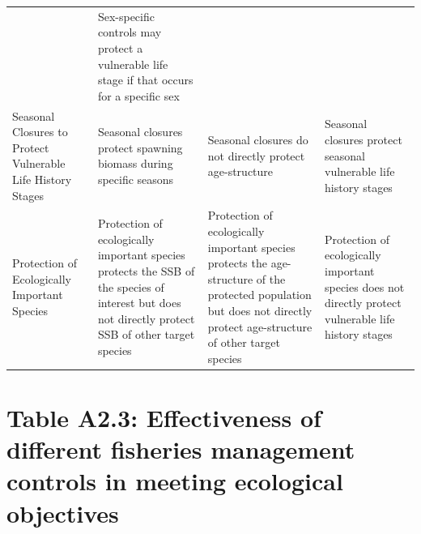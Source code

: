 \documentclass[]{book}
\begin{document}
\begin{longtable}[]{@{}llll@{}}
\begin{minipage}[t]{0.22\columnwidth}
\end{minipage} & \begin{minipage}[t]{0.22\columnwidth}\raggedright\strut
Sex-specific controls may protect a vulnerable life stage if that occurs
for a specific sex\strut
\end{minipage}\tabularnewline
\begin{minipage}[t]{0.22\columnwidth}\raggedright\strut
Seasonal Closures to Protect Vulnerable Life History Stages\strut
\end{minipage} & \begin{minipage}[t]{0.22\columnwidth}\raggedright\strut
Seasonal closures protect spawning biomass during specific seasons\strut
\end{minipage} & \begin{minipage}[t]{0.22\columnwidth}\raggedright\strut
Seasonal closures do not directly protect age-structure\strut
\end{minipage} & \begin{minipage}[t]{0.22\columnwidth}\raggedright\strut
Seasonal closures protect seasonal vulnerable life history stages\strut
\end{minipage}\tabularnewline
\begin{minipage}[t]{0.22\columnwidth}\raggedright\strut
Protection of Ecologically Important Species\strut
\end{minipage} & \begin{minipage}[t]{0.22\columnwidth}\raggedright\strut
Protection of ecologically important species protects the SSB of the
species of interest but does not directly protect SSB of other target
species\strut
\end{minipage} & \begin{minipage}[t]{0.22\columnwidth}\raggedright\strut
Protection of ecologically important species protects the age-structure
of the protected population but does not directly protect age-structure
of other target species\strut
\end{minipage} & \begin{minipage}[t]{0.22\columnwidth}\raggedright\strut
Protection of ecologically important species does not directly protect
vulnerable life history stages\strut
\end{minipage}\tabularnewline
\bottomrule
\end{longtable}

\section{Table A2.3: Effectiveness of different fisheries management
controls in meeting ecological
objectives}\label{table-a2.3-effectiveness-of-different-fisheries-management-controls-in-meeting-ecological-objectives}
\end{document}
